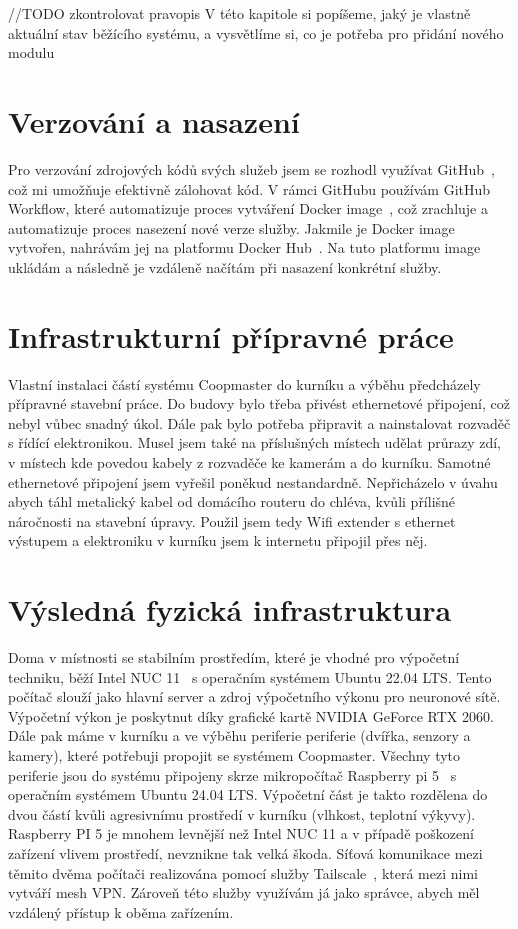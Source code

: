 //TODO zkontrolovat pravopis\newline
V této kapitole si popíšeme, jaký je vlastně aktuální stav běžícího systému, a vysvětlíme si, co je potřeba pro přidání nového modulu
\section*{Verzování a nasazení}

Pro verzování zdrojových kódů svých služeb jsem se rozhodl využívat GitHub~\cite{GitHubExplanation}, což mi umožňuje efektivně zálohovat kód.
V rámci GitHubu používám GitHub Workflow, které automatizuje proces vytváření Docker image~\cite{GitHubActionsDocker}, což zrachluje a automatizuje proces nasezení nové verze služby.
Jakmile je Docker image vytvořen, nahrávám jej na platformu Docker Hub~\cite{DockerHub}.
Na tuto platformu image ukládám a následně je vzdáleně načítám při nasazení konkrétní služby.
\section*{Infrastrukturní přípravné práce}

Vlastní instalaci částí systému Coopmaster do kurníku a výběhu předcházely přípravné stavební práce.
Do budovy bylo třeba přivést ethernetové připojení, což nebyl vůbec snadný úkol.
Dále pak bylo potřeba připravit a nainstalovat rozvaděč s řídící elektronikou.
Musel jsem také na příslušných místech udělat průrazy zdí, v místech kde povedou kabely z rozvaděče ke kamerám a do kurníku.
Samotné ethernetové připojení jsem vyřešil poněkud nestandardně.
Nepřicházelo v úvahu abych táhl metalický kabel od domácího routeru do chléva, kvůli přílišné náročnosti na stavební úpravy.
Použil jsem tedy Wifi extender s ethernet výstupem a elektroniku v kurníku jsem k internetu připojil přes něj.
\section*{Výsledná fyzická infrastruktura}

Doma v místnosti se stabilním prostředím, které je vhodné pro výpočetní techniku, běží Intel NUC 11~\cite{IntelNUC11Enthusiast} s operačním systémem Ubuntu 22.04 LTS.
Tento počítač slouží jako hlavní server a zdroj výpočetního výkonu pro neuronové sítě.
Výpočetní výkon je poskytnut díky grafické kartě NVIDIA GeForce RTX 2060.\newline
Dále pak máme v kurníku a ve výběhu periferie periferie (dvířka, senzory a kamery), které potřebuji propojit se systémem Coopmaster.
Všechny tyto periferie jsou do systému připojeny skrze mikropočítač Raspberry pi 5~\cite{RaspberryPi5} s operačním systémem Ubuntu 24.04 LTS.
Výpočetní část je takto rozdělena do dvou částí kvůli agresivnímu prostředí v kurníku (vlhkost, teplotní výkyvy).
Raspberry PI 5 je mnohem levnější než Intel NUC 11 a v případě poškození zařízení vlivem prostředí, nevznikne tak velká škoda.
Síťová komunikace mezi těmito dvěma počítači realizována pomocí služby Tailscale~\cite{Tailscale}, která mezi nimi vytváří mesh VPN.
Zároveň této služby využívám já jako správce, abych měl vzdálený přístup k oběma zařízením.

